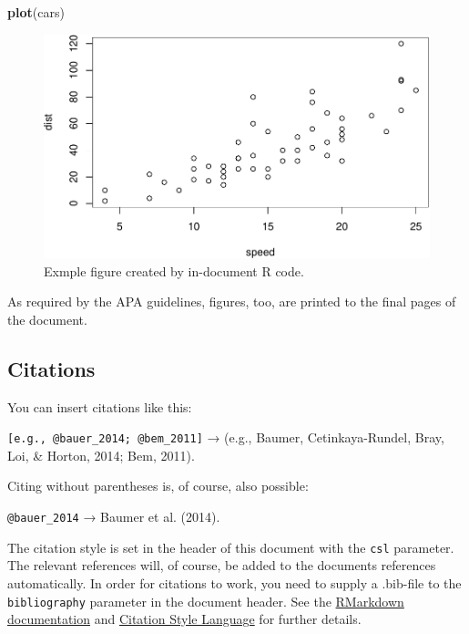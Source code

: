 \documentclass[american,man]{apa6}
\newenvironment{Shaded}{\begin{snugshade}}{\end{snugshade}}
\newcommand{\KeywordTok}[1]{\textcolor[rgb]{0.13,0.29,0.53}{\textbf{{#1}}}}
\newcommand{\NormalTok}[1]{{#1}}
\begin{document}
\begin{Shaded}
\begin{Highlighting}[]
\KeywordTok{plot}\NormalTok{(cars)}
\end{Highlighting}
\end{Shaded}

\begin{figure}[htbp]
\centering
\includegraphics{./example_files/figure-latex/unnamed-chunk-3.pdf}
\caption{Exmple figure created by in-document R code.}
\end{figure}

As required by the APA guidelines, figures, too, are printed to the
final pages of the document.

\subsection{Citations}\label{citations}

You can insert citations like this:

\texttt{{[}e.g., @bauer\_2014; @bem\_2011{]}} → (e.g., {Baumer},
{Cetinkaya-Rundel}, {Bray}, {Loi}, \& {Horton}, 2014; Bem, 2011).

Citing without parentheses is, of course, also possible:

\texttt{@bauer\_2014} → {Baumer} et al. (2014).

The citation style is set in the header of this document with the
\texttt{csl} parameter. The relevant references will, of course, be
added to the documents references automatically. In order for citations
to work, you need to supply a .bib-file to the \texttt{bibliography}
parameter in the document header. See the
\href{http://rmarkdown.rstudio.com/authoring_bibliographies_and_citations.html}{RMarkdown
documentation} and \href{http://citationstyles.org/}{Citation Style
Language} for further details.
\end{document}
